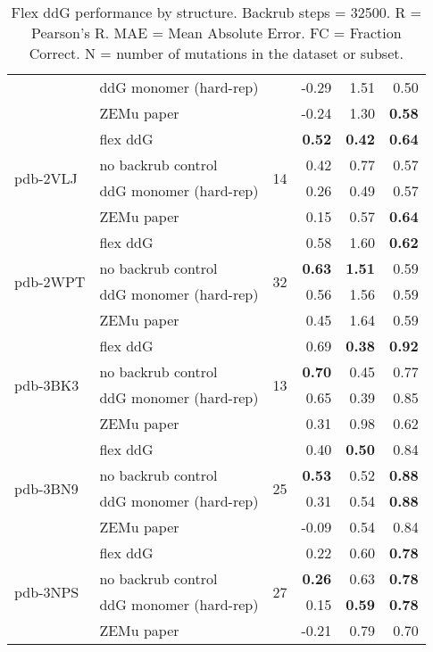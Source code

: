 \begin{table}
\begin{tabular}{llrrrr}
 & ddG monomer (hard-rep) & & -0.29 & 1.51 & 0.50  \\
 & ZEMu paper & & -0.24 & 1.30 & \textbf{0.58}  \\
\hline
 \multirow{ 4}{*}{pdb-2VLJ} & flex ddG & \multirow{ 4}{*}{14} & \textbf{0.52} & \textbf{0.42} & \textbf{0.64}  \\
 & no backrub control & & 0.42 & 0.77 & 0.57  \\
 & ddG monomer (hard-rep) & & 0.26 & 0.49 & 0.57  \\
 & ZEMu paper & & 0.15 & 0.57 & \textbf{0.64}  \\
\hline
 \multirow{ 4}{*}{pdb-2WPT} & flex ddG & \multirow{ 4}{*}{32} & 0.58 & 1.60 & \textbf{0.62}  \\
 & no backrub control & & \textbf{0.63} & \textbf{1.51} & 0.59  \\
 & ddG monomer (hard-rep) & & 0.56 & 1.56 & 0.59  \\
 & ZEMu paper & & 0.45 & 1.64 & 0.59  \\
\hline
 \multirow{ 4}{*}{pdb-3BK3} & flex ddG & \multirow{ 4}{*}{13} & 0.69 & \textbf{0.38} & \textbf{0.92}  \\
 & no backrub control & & \textbf{0.70} & 0.45 & 0.77  \\
 & ddG monomer (hard-rep) & & 0.65 & 0.39 & 0.85  \\
 & ZEMu paper & & 0.31 & 0.98 & 0.62  \\
\hline
 \multirow{ 4}{*}{pdb-3BN9} & flex ddG & \multirow{ 4}{*}{25} & 0.40 & \textbf{0.50} & 0.84  \\
 & no backrub control & & \textbf{0.53} & 0.52 & \textbf{0.88}  \\
 & ddG monomer (hard-rep) & & 0.31 & 0.54 & \textbf{0.88}  \\
 & ZEMu paper & & -0.09 & 0.54 & 0.84  \\
\hline
 \multirow{ 4}{*}{pdb-3NPS} & flex ddG & \multirow{ 4}{*}{27} & 0.22 & 0.60 & \textbf{0.78}  \\
 & no backrub control & & \textbf{0.26} & 0.63 & \textbf{0.78}  \\
 & ddG monomer (hard-rep) & & 0.15 & \textbf{0.59} & \textbf{0.78}  \\
 & ZEMu paper & & -0.21 & 0.79 & 0.70  \\
\bottomrule
\end{tabular}
  \caption[Flex ddG performance by structure]{
    Flex ddG performance by structure. Backrub steps = 32500. R = Pearson's R. MAE = Mean Absolute Error. FC = Fraction Correct. N = number of mutations in the dataset or subset.
  } \label{tab:table-by-structure}
\end{table}
